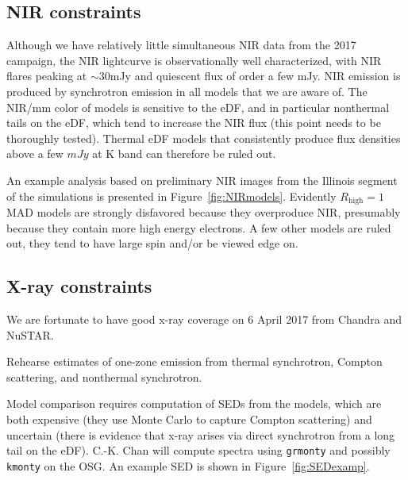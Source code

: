 \documentclass[twocolumn,tighten,dvipsnames]{aastex63}
\newcommand\Rh{R_\mathrm{high}}
\newcommand\<{{\langle}}
\renewcommand\>{{\rangle}} %
\begin{document}
\subsection{NIR constraints}
\label{sec:nirconst}

Although we have relatively little simultaneous NIR data from the 2017 campaign, the NIR lightcurve is observationally well characterized, with NIR flares peaking at $\sim 30$mJy and quiescent flux of order a few mJy.  NIR emission is produced by synchrotron emission in all models that we are aware of.  The NIR/mm color of models is sensitive to the eDF, and in particular nonthermal tails on the eDF, which tend to increase the NIR flux (this point needs to be thoroughly tested).  Thermal eDF models that consistently produce flux densities above a few $mJy$ at K band can therefore be ruled out.

An example analysis based on preliminary NIR images from the Illinois segment of the simulations is presented in Figure~\ref{fig:NIRmodels}.  Evidently $\Rh = 1$ MAD models are strongly disfavored because they overproduce NIR, presumably because they contain more high energy electrons.  A few other models are ruled out, they tend to have large spin and/or be viewed edge on.

\begin{figure*}
  \caption{Left: MAD models, Right: SANE models.  Models marked with a red dot consistently overproduce NIR emission, green dots indicate models that do not overproduce NIR.  The inclination is indicated by the position of the dot, with face-on models near twelve o'clock and edge-on models near three o'clock.}
  \label{fig:NIRmodels}
\end{figure*}

\subsection{X-ray constraints}
\label{sec:xrayconst}

We are fortunate to have good x-ray coverage on 6 April 2017 from Chandra and NuSTAR.

Rehearse estimates of one-zone emission from thermal synchrotron, Compton scattering, and nonthermal synchrotron.

Model comparison requires computation of SEDs from the models, which are both expensive (they use Monte Carlo to capture Compton scattering) and uncertain (there is evidence that x-ray arises via direct synchrotron from a long tail on the eDF).  C.-K. Chan will compute spectra using {\tt grmonty} and possibly {\tt kmonty} on the OSG.  An example SED is shown in Figure~\ref{fig:SEDexamp}.
\end{document}
